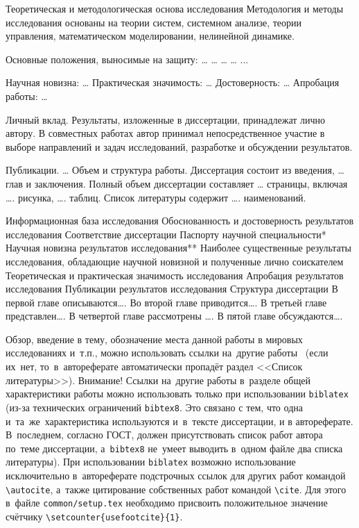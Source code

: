 Теоретическая и методологическая основа исследования
Методология и методы исследования основаны на теории систем, системном анализе, теории управления, математическом моделировании, нелинейной динамике.

Основные положения, выносимые на защиту:
…
…
…
…
...


Научная новизна:
…
Практическая значимость:
…
Достоверность:
…
Апробация работы:
…

Личный вклад. Результаты, изложенные в диссертации, принадлежат лич­но автору. В совместных работах автор принимал непосредственное участие в выборе направлений и задач исследований, разработке и обсуждении результатов.

Публикации. …
Объем и структура работы. Диссертация состоит из введения, … глав и заключения. Полный объем диссертации составляет … страницы, включая …. рисунка, …. таблиц. Список литературы содержит …. наименований.

Информационная база исследования
Обоснованность и достоверность результатов исследования
Соответствие диссертации Паспорту научной специальности* 
Научная новизна результатов исследования**
Наиболее существенные результаты исследования, обладающие научной новизной и полученные лично соискателем
Теоретическая и практическая значимость исследования
Апробация результатов исследования
Публикации результатов исследования
Структура диссертации
В первой главе описываются….
Во второй главе приводится….
В третьей главе представлен….
В четвертой главе рассмотрены ….
В пятой главе обсуждаются….


Обзор, введение в тему, обозначение места данной работы в
мировых исследованиях и~т.\:п., можно использовать ссылки на~другие
работы~\autocite{Gosele1999161,Lermontov}
(если их~нет, то~в~автореферате
автоматически пропадёт раздел <<Список литературы>>). Внимание! Ссылки
на~другие работы в~разделе общей характеристики работы можно
использовать только при использовании \verb!biblatex! (из-за технических
ограничений \verb!bibtex8!. Это связано с тем, что одна
и~та~же~характеристика используются и~в~тексте диссертации, и в
автореферате. В~последнем, согласно ГОСТ, должен присутствовать список
работ автора по~теме диссертации, а~\verb!bibtex8! не~умеет выводить в~одном
файле два списка литературы).
При использовании \verb!biblatex! возможно использование исключительно
в~автореферате подстрочных ссылок
для других работ командой \verb!\autocite!, а~также цитирование
собственных работ командой \verb!\cite!. Для этого в~файле
\verb!common/setup.tex! необходимо присвоить положительное значение
счётчику \verb!\setcounter{usefootcite}{1}!.

